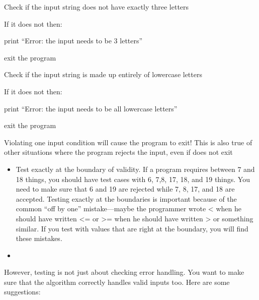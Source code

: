 \documentclass[11pt, a4paper]{article}
\begin{document}
Check if the input string does not have exactly three letters

If it does not then:

print “Error: the input needs to be 3 letters”

exit the program

Check if the input string is made up entirely of lowercase letters

If it does not then:

print “Error: the input needs to be all lowercase letters”

exit the program

Violating one input condition will cause the program to exit! This is also true of other situations where the program rejects the input, even if does not exit

\begin{itemize}
  \item Test exactly at the boundary of validity. If a program requires between 7 and 18 things, you should have test cases with 6, 7,8, 17, 18, and 19 things. You need to make sure that 6 and 19 are rejected while 7, 8, 17, and 18 are accepted. Testing exactly at the boundaries is important because of the common “off by one” mistake---maybe the programmer wrote < when he should have written <= or >= when he should have written > or something similar. If you test with values that are right at the boundary, you will find these mistakes.
  \item 
\end{itemize}

However, testing is not just about checking error handling. You want to make sure that the algorithm correctly handles valid inputs too. Here are some suggestions:
\end{document}
